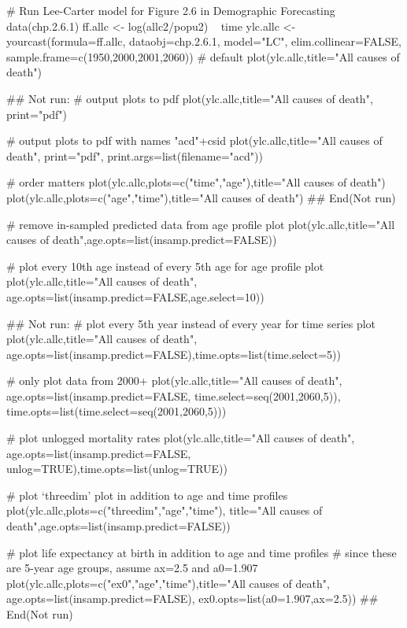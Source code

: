 \begin{Examples}
\begin{ExampleCode}
# Run Lee-Carter model for Figure 2.6 in Demographic Forecasting
data(chp.2.6.1)
ff.allc <- log(allc2/popu2) ~  time	
ylc.allc <- yourcast(formula=ff.allc, dataobj=chp.2.6.1, model="LC",
                       elim.collinear=FALSE,
                       sample.frame=c(1950,2000,2001,2060))
# default
plot(ylc.allc,title="All causes of death")

## Not run: 
# output plots to pdf
plot(ylc.allc,title="All causes of death", print="pdf")

# output plots to pdf with names "acd"+csid
plot(ylc.allc,title="All causes of death", print="pdf",
print.args=list(filename="acd"))

# order matters
plot(ylc.allc,plots=c("time","age"),title="All causes of death")
plot(ylc.allc,plots=c("age","time"),title="All causes of death")
## End(Not run)

# remove in-sampled predicted data from age profile plot
plot(ylc.allc,title="All causes of death",age.opts=list(insamp.predict=FALSE))

# plot every 10th age instead of every 5th age for age profile plot
plot(ylc.allc,title="All causes of death",
age.opts=list(insamp.predict=FALSE,age.select=10))

## Not run: 
# plot every 5th year instead of every year for time series plot
plot(ylc.allc,title="All causes of death",
age.opts=list(insamp.predict=FALSE),time.opts=list(time.select=5))

# only plot data from 2000+
plot(ylc.allc,title="All causes of death",
age.opts=list(insamp.predict=FALSE, time.select=seq(2001,2060,5)),
time.opts=list(time.select=seq(2001,2060,5)))

# plot unlogged mortality rates
plot(ylc.allc,title="All causes of death",
age.opts=list(insamp.predict=FALSE, unlog=TRUE),time.opts=list(unlog=TRUE))

# plot `threedim' plot in addition to age and time profiles
plot(ylc.allc,plots=c("threedim","age","time"),
title="All causes of death",age.opts=list(insamp.predict=FALSE))

# plot life expectancy at birth in addition to age and time profiles
# since these are 5-year age groups, assume ax=2.5 and a0=1.907
plot(ylc.allc,plots=c("ex0","age","time"),title="All causes of death",
age.opts=list(insamp.predict=FALSE), ex0.opts=list(a0=1.907,ax=2.5))
## End(Not run)

\end{ExampleCode}
\end{Examples}
